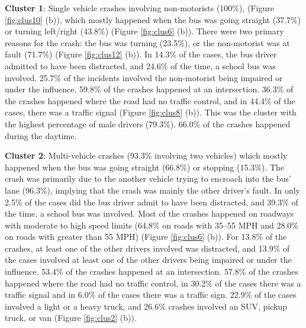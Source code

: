 \noindent
\textbf{Cluster 1}: Single vehicle crashes involving non-motorists (100\%), (Figure \ref{fig:clus10} (b)), which mostly happened when the bus was going straight (37.7\%) or turning left/right (43.8\%) (Figure \ref{fig:clus6} (b)). There were two primary reasons for the crash: the bus was turning (23.5\%), or  the non-motorist was at fault (71.7\%) (Figure \ref{fig:clus12} (b)). In 14.3\% of the cases, the bus driver admitted to have been distracted, and 24.6\% of the time, a school bus was involved. 25.7\% of the incidents involved the non-motorist being impaired or under the influence. 59.8\% of the crashes happened at an intersection. 36.3\% of the crashes happened where the road had no traffic control, and in 44.4\% of the cases, there was a traffic signal (Figure \ref{fig:clus8} (b)). This was the cluster with the highest percentage of male drivers (79.3\%). 66.0\% of the crashes happened during the daytime.

\noindent
\textbf{Cluster 2}: Multi-vehicle crashes (93.3\% involving two vehicles) which mostly happened when the bus was going straight (66.8\%) or stopping (15.3\%). The crash was primarily due to the another vehicle trying to encroach into the bus' lane (96.3\%), implying that the crash was mainly the other driver's fault. In only  2.5\% of the cases did the bus driver admit to have been distracted, and 39.3\% of the time, a school bus was involved. Most of the crashes happened on roadways with moderate to high speed limits (64.8\% on roads with 35--55 MPH and 28.0\% on roads with greater than 55 MPH) (Figure \ref{fig:clus6} (b)). For 13.8\% of the crashes, at least one of the other drivers involved was distracted, and 13.9\% of the cases involved at least one of the other drivers being impaired or under the influence. 53.4\% of the crashes happened at an intersection. 57.8\% of the crashes happened where the road had no traffic control, in 30.2\% of the cases there was a traffic signal and in 6.0\% of the cases there was a traffic sign. 22.9\% of the cases involved a light or a heavy truck, and 26.6\% crashes involved an SUV, pickup truck, or van (Figure \ref{fig:clus2} (b)).

